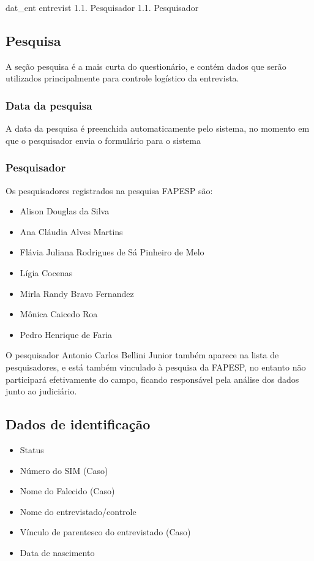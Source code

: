 dat\_ent		
entrevist	1.1. Pesquisador	1.1. Pesquisador

\subsection*{Pesquisa}

A seção pesquisa é a mais curta do questionário, e contém dados que serão utilizados principalmente para controle logístico da entrevista.

\subsubsection{Data da pesquisa}

A data da pesquisa é preenchida automaticamente pelo sistema, no momento em que o pesquisador envia o formulário para o sistema

\subsubsection{Pesquisador}
Os pesquisadores registrados na pesquisa FAPESP são:

\begin{itemize}
    \item Alison Douglas da Silva
    \item Ana Cláudia Alves Martins
    \item Flávia Juliana Rodrigues de Sá Pinheiro de Melo
    \item Lígia Cocenas
    \item Mirla Randy Bravo Fernandez
    \item Mônica Caicedo Roa
    \item Pedro Henrique de Faria
\end{itemize}

O pesquisador Antonio Carlos Bellini Junior também aparece na lista de pesquisadores, e está também vinculado à pesquisa da FAPESP, no entanto não participará efetivamente do campo, ficando responsável pela análise dos dados junto ao judiciário.


\subsection*{Dados de identificação}

\begin{itemize}
    \item Status
    \item Número do SIM (Caso)
    \item Nome do Falecido (Caso)
    \item Nome do entrevistado/controle
    \item Vínculo de parentesco do entrevistado (Caso)
    \item Data de nascimento
\end{itemize}

